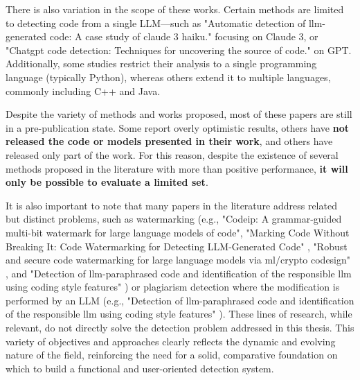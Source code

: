 There is also variation in the scope of these works. 
Certain methods are limited to detecting code from a single LLM—such as 
"Automatic detection of llm-generated code: A case study of claude 
3 haiku."\cite{anthropic2024model} focusing on Claude 3, 
or "Chatgpt code detection: Techniques for uncovering the source of code." 
\cite{oedingen2024chatgpt} on GPT. 
Additionally, some studies restrict their analysis to a single programming 
language (typically Python), whereas others extend it to multiple 
languages, commonly including C++ and Java.

Despite the variety of methods and works proposed, 
most of these papers are still in a pre-publication state. 
Some report overly optimistic results, others have \textbf{not released the 
code or models presented in their work}, and others have released only 
part of the work.
For this reason, despite the existence of several methods 
proposed in the literature with more than positive performance, 
\textbf{it will only be possible to evaluate a limited set}.

It is also important to note that many papers in the literature address 
related but distinct problems, such as watermarking 
(e.g., "Codeip: A grammar-guided multi-bit watermark for large language 
models of code"\cite{guan2024codeip}, 
"Marking Code Without Breaking It: Code Watermarking for 
Detecting LLM-Generated Code" \cite{kim2025marking}, 
"Robust and secure code watermarking for large 
language models via ml/crypto codesign" \cite{zhang2025robust}, 
and "Detection of llm-paraphrased code and identification of the 
responsible llm using coding style features" \cite{park2025detection}) 
or plagiarism detection where the modification 
is performed by an LLM (e.g., "Detection of llm-paraphrased code and 
identification of the responsible llm using coding style features" 
\cite{park2025detection}). These lines of 
research, while relevant, do not directly solve the detection problem 
addressed in this thesis. This variety of objectives and approaches 
clearly reflects the dynamic and evolving nature of the field, reinforcing 
the need for a solid, comparative foundation on which to build a functional 
and user-oriented detection system.


